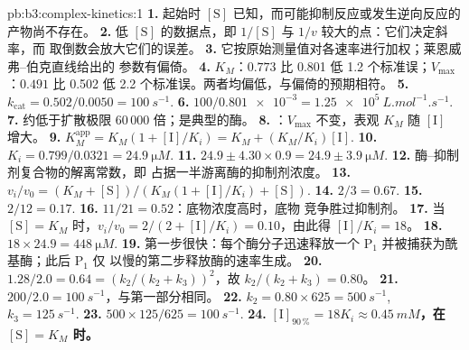 \begin{solution}{pb:b3:complex-kinetics:1}
\textbf{1.} 起始时 $[\mathrm S]$ 已知，而可能抑制反应或发生逆向反应的
产物尚不存在。
\textbf{2.} 低 $[\mathrm S]$ 的数据点，即 $1/[\mathrm S]$ 与 $1/v$ 较大的点：它们决定斜率，而
取倒数会放大它们的误差。
\textbf{3.} 它按原始测量值对各速率进行加权；莱恩威弗–伯克直线给出的
参数有偏倚。
\textbf{4.} $K_M$：$0.773$ 比 0.801 低 1.2 个标准误；$V_{\max}$：$0.491$ 比
0.502 低 2.2 个标准误。两者均偏低，与偏倚的预期相符。
\textbf{5.} $k_{\mathrm{cat}} = 0.502/0.0050 = \qty{100}{s^{-1}}$.
\textbf{6.} $100/\num{0.801e-3} = \qty{1.25e5}{L.mol^{-1}.s^{-1}}$.
\textbf{7.} 约低于扩散极限 60\,000 倍；是典型的酶。
\textbf{8.} ：$V_{\max}$ 不变，表观 $K_M$ 随 $[\mathrm I]$ 增大。
\textbf{9.} $K_M^{\mathrm{app}} = K_M(1 + [\mathrm I]/K_i) = K_M + (K_M/K_i)[\mathrm I]$.
\textbf{10.} $K_i = 0.799/0.0321 = \qty{24.9}{\micro M}$.
\textbf{11.} $24.9 \pm 4.30 \times 0.9 = 24.9 \pm \qty{3.9}{\micro M}$.
\textbf{12.} 酶–抑制剂复合物的解离常数，即
占据一半游离酶的抑制剂浓度。
\textbf{13.} $v_i/v_0 = (K_M + [\mathrm S])/(K_M(1 + [\mathrm I]/K_i) + [\mathrm S])$.
\textbf{14.} $2/3 = 0.67$.
\textbf{15.} $2/12 = 0.17$.
\textbf{16.} $11/21 = 0.52$：底物浓度高时，底物
竞争胜过抑制剂。
\textbf{17.} 当 $[\mathrm S] = K_M$ 时，$v_i/v_0 = 2/(2 + [\mathrm I]/K_i) = 0.10$，由此得 $[\mathrm I]/K_i = 18$。
\textbf{18.} $18 \times 24.9 = \qty{448}{\micro M}$.
\textbf{19.} 第一步很快：每个酶分子迅速释放一个 $\mathrm P_1$
并被捕获为酰基酶；此后 $\mathrm P_1$ 仅
以慢的第二步释放酶的速率生成。
\textbf{20.} $1.28/2.0 = 0.64 = (k_2/(k_2 + k_3))^2$，故 $k_2/(k_2 + k_3) = 0.80$。
\textbf{21.} $200/2.0 = \qty{100}{s^{-1}}$，与第一部分相同。
\textbf{22.} $k_2 = 0.80 \times 625 = \qty{500}{s^{-1}}$, $k_3 = \qty{125}{s^{-1}}$.
\textbf{23.} $500 \times 125/625 = \qty{100}{s^{-1}}$.
\textbf{24.} \textbf{$[\mathrm I]_{90\,\%} = 18K_i \approx \qty{0.45}{mM}$，在 $[\mathrm S] = K_M$ 时。}
\end{solution}
